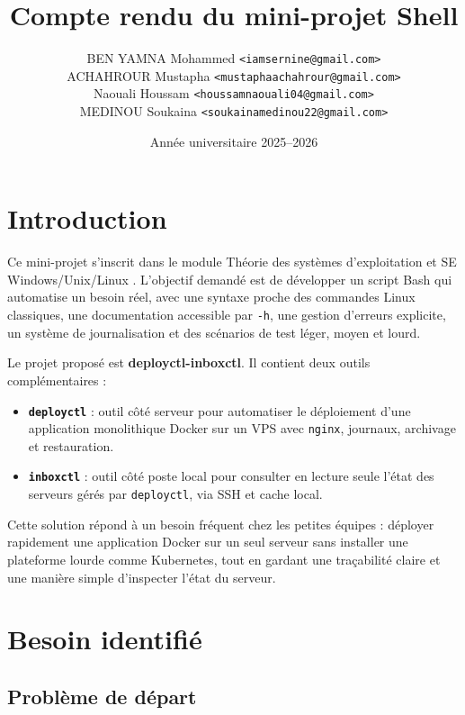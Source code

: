\documentclass[12pt,a4paper]{article}
\title{\textbf{Compte rendu du mini-projet Shell}\\\ProjectName}
\author{
BEN YAMNA Mohammed \texttt{<iamsernine@gmail.com>}\\
ACHAHROUR Mustapha \texttt{<mustaphaachahrour@gmail.com>}\\
Naouali Houssam \texttt{<houssamnaouali04@gmail.com>}\\
MEDINOU Soukaina \texttt{<soukainamedinou22@gmail.com>}
}
\date{Année universitaire 2025--2026}
\newcommand{\ProjectName}{deployctl-inboxctl}
\begin{document}
\maketitle
\tableofcontents
\newpage

\section{Introduction}

Ce mini-projet s'inscrit dans le module \og Théorie des systèmes d'exploitation et SE Windows/Unix/Linux \fg. L'objectif demandé est de développer un script Bash qui automatise un besoin réel, avec une syntaxe proche des commandes Linux classiques, une documentation accessible par \texttt{-h}, une gestion d'erreurs explicite, un système de journalisation et des scénarios de test léger, moyen et lourd.

Le projet proposé est \textbf{\ProjectName}. Il contient deux outils complémentaires :
\begin{itemize}[leftmargin=*]
  \item \textbf{\texttt{deployctl}} : outil côté serveur pour automatiser le déploiement d'une application monolithique Docker sur un VPS avec \texttt{nginx}, journaux, archivage et restauration.
  \item \textbf{\texttt{inboxctl}} : outil côté poste local pour consulter en lecture seule l'état des serveurs gérés par \texttt{deployctl}, via SSH et cache local.
\end{itemize}

Cette solution répond à un besoin fréquent chez les petites équipes : déployer rapidement une application Docker sur un seul serveur sans installer une plateforme lourde comme Kubernetes, tout en gardant une traçabilité claire et une manière simple d'inspecter l'état du serveur.

\section{Besoin identifié}

\subsection{Problème de départ}
\end{document}

